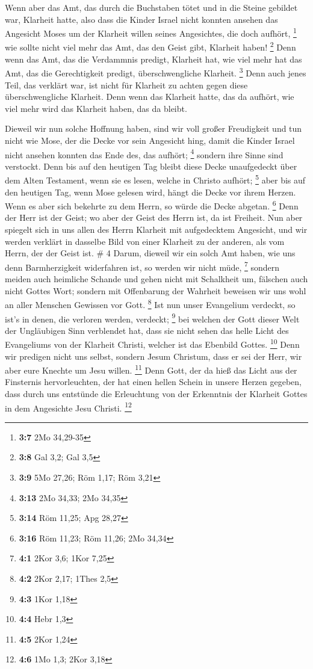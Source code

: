  Wenn aber das Amt, das durch die Buchstaben tötet und in
die Steine gebildet war, Klarheit hatte, also dass die Kinder Israel
nicht konnten ansehen das Angesicht Moses um der Klarheit willen seines
Angesichtes, die doch aufhört, \footnote{\textbf{3:7} 2Mo 34,29-35}
 wie sollte nicht viel mehr das Amt, das den Geist gibt,
Klarheit haben! \footnote{\textbf{3:8} Gal 3,2; Gal 3,5} 
Denn wenn das Amt, das die Verdammnis predigt, Klarheit hat, wie viel
mehr hat das Amt, das die Gerechtigkeit predigt, überschwengliche
Klarheit. \footnote{\textbf{3:9} 5Mo 27,26; Röm 1,17; Röm 3,21}
 Denn auch jenes Teil, das verklärt war, ist nicht für
Klarheit zu achten gegen diese überschwengliche Klarheit. 
Denn wenn das Klarheit hatte, das da aufhört, wie viel mehr wird das
Klarheit haben, das da bleibt.

 Dieweil wir nun solche Hoffnung haben, sind wir voll
großer Freudigkeit  und tun nicht wie Mose, der die Decke
vor sein Angesicht hing, damit die Kinder Israel nicht ansehen konnten
das Ende des, das aufhört; \footnote{\textbf{3:13} 2Mo 34,33; 2Mo 34,35}
 sondern ihre Sinne sind verstockt. Denn bis auf den
heutigen Tag bleibt diese Decke unaufgedeckt über dem Alten Testament,
wenn sie es lesen, welche in Christo aufhört; \footnote{\textbf{3:14}
  Röm 11,25; Apg 28,27}  aber bis auf den heutigen Tag,
wenn Mose gelesen wird, hängt die Decke vor ihrem Herzen. 
Wenn es aber sich bekehrte zu dem Herrn, so würde die Decke abgetan.
\footnote{\textbf{3:16} Röm 11,23; Röm 11,26; 2Mo 34,34} 
Denn der Herr ist der Geist; wo aber der Geist des Herrn ist, da ist
Freiheit.  Nun aber spiegelt sich in uns allen des Herrn
Klarheit mit aufgedecktem Angesicht, und wir werden verklärt in dasselbe
Bild von einer Klarheit zu der anderen, als vom Herrn, der der Geist
ist. \# 4  Darum, dieweil wir ein solch Amt haben, wie uns
denn Barmherzigkeit widerfahren ist, so werden wir nicht müde,
\footnote{\textbf{4:1} 2Kor 3,6; 1Kor 7,25}  sondern meiden
auch heimliche Schande und gehen nicht mit Schalkheit um, fälschen auch
nicht Gottes Wort; sondern mit Offenbarung der Wahrheit beweisen wir uns
wohl an aller Menschen Gewissen vor Gott. \footnote{\textbf{4:2} 2Kor
  2,17; 1Thes 2,5}  Ist nun unser Evangelium verdeckt, so
ist's in denen, die verloren werden, verdeckt; \footnote{\textbf{4:3}
  1Kor 1,18}  bei welchen der Gott dieser Welt der
Ungläubigen Sinn verblendet hat, dass sie nicht sehen das helle Licht
des Evangeliums von der Klarheit Christi, welcher ist das Ebenbild
Gottes. \footnote{\textbf{4:4} Hebr 1,3}  Denn wir predigen
nicht uns selbst, sondern Jesum Christum, dass er sei der Herr, wir aber
eure Knechte um Jesu willen. \footnote{\textbf{4:5} 2Kor 1,24}
 Denn Gott, der da hieß das Licht aus der Finsternis
hervorleuchten, der hat einen hellen Schein in unsere Herzen gegeben,
dass durch uns entstünde die Erleuchtung von der Erkenntnis der Klarheit
Gottes in dem Angesichte Jesu Christi. \footnote{\textbf{4:6} 1Mo 1,3;
  2Kor 3,18}

